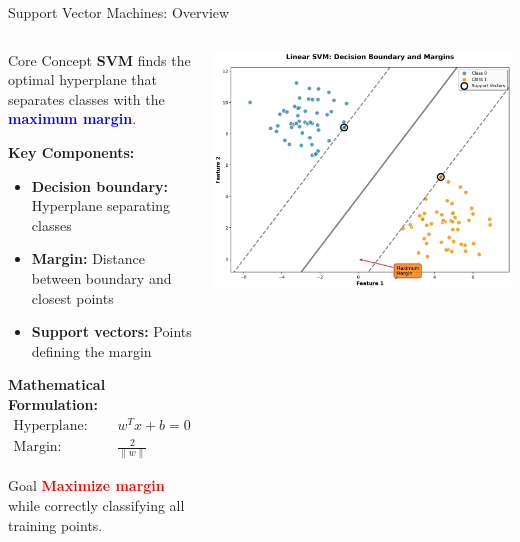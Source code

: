 \documentclass[8pt,aspectratio=1610]{beamer}
\begin{document}
\begin{frame}{Support Vector Machines: Overview}
\begin{columns}[t]
\begin{column}{0.48\textwidth}
\begin{block}{Core Concept}
\textbf{SVM} finds the optimal hyperplane that separates classes with the \textcolor{blue}{\textbf{maximum margin}}.
\end{block}

\vspace{0.3cm}
\textbf{Key Components:}
\begin{itemize}
\setlength{\itemsep}{1pt}
\item \textbf{Decision boundary:} Hyperplane separating classes
\item \textbf{Margin:} Distance between boundary and closest points
\item \textbf{Support vectors:} Points defining the margin
\end{itemize}

\vspace{0.3cm}
\textbf{Mathematical Formulation:}
\begin{align}
\text{Hyperplane: } &\quad w^T x + b = 0 \\
\text{Margin: } &\quad \frac{2}{\|w\|}
\end{align}

\begin{alertblock}{Goal}
\textcolor{red}{\textbf{Maximize margin}} while correctly classifying all training points.
\end{alertblock}
\end{column}

\begin{column}{0.48\textwidth}
\begin{center}
\includegraphics[width=\textwidth]{../figures/linear_svm_margins.png}
\end{center}


\end{column}
\end{columns}
\end{frame}
\end{document}
